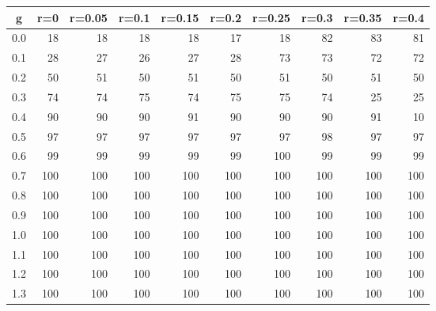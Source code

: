 %
\begin{table}[!tbp]
 \begin{center}
 \begin{tabular}{rrrrrrrrrr}\hline\hline
\multicolumn{1}{c}{g}&\multicolumn{1}{c}{r=0}&\multicolumn{1}{c}{r=0.05}&\multicolumn{1}{c}{r=0.1}&\multicolumn{1}{c}{r=0.15}&\multicolumn{1}{c}{r=0.2}&\multicolumn{1}{c}{r=0.25}&\multicolumn{1}{c}{r=0.3}&\multicolumn{1}{c}{r=0.35}&\multicolumn{1}{c}{r=0.4}\tabularnewline
\hline
0.0& 18& 18& 18& 18& 17& 18& 82& 83& 81\tabularnewline
0.1& 28& 27& 26& 27& 28& 73& 73& 72& 72\tabularnewline
0.2& 50& 51& 50& 51& 50& 51& 50& 51& 50\tabularnewline
0.3& 74& 74& 75& 74& 75& 75& 74& 25& 25\tabularnewline
0.4& 90& 90& 90& 91& 90& 90& 90& 91& 10\tabularnewline
0.5& 97& 97& 97& 97& 97& 97& 98& 97& 97\tabularnewline
0.6& 99& 99& 99& 99& 99&100& 99& 99& 99\tabularnewline
0.7&100&100&100&100&100&100&100&100&100\tabularnewline
0.8&100&100&100&100&100&100&100&100&100\tabularnewline
0.9&100&100&100&100&100&100&100&100&100\tabularnewline
1.0&100&100&100&100&100&100&100&100&100\tabularnewline
1.1&100&100&100&100&100&100&100&100&100\tabularnewline
1.2&100&100&100&100&100&100&100&100&100\tabularnewline
1.3&100&100&100&100&100&100&100&100&100\tabularnewline
\hline
\end{tabular}

\end{center}

\end{table}

